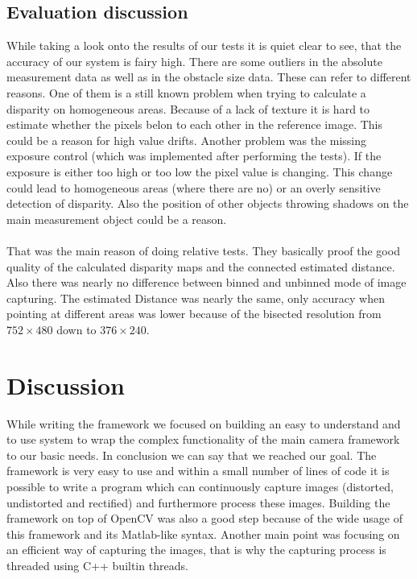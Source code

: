\documentclass[11pt]{article}
\begin{document}
\subsection{Evaluation discussion}
While taking a look onto the results of our tests it is quiet clear to see, that the accuracy of our system is fairy high. There are some outliers in the absolute measurement data as well as in the obstacle size data. These can refer to different reasons. One of them is a still known problem when trying to calculate a disparity on homogeneous areas. Because of a lack of texture it is hard to estimate whether the pixels belon to each other in the reference image. This could be a reason for high value drifts. Another problem was the missing exposure control (which was implemented after performing the tests). If the exposure is either too high or too low the pixel value is changing. This change could lead to homogeneous areas (where there are no) or an overly sensitive detection of disparity. Also the position of other objects throwing shadows on the main measurement object could be a reason. \\\\
That was the main reason of doing relative tests. They basically proof the good quality of the calculated disparity maps and the connected estimated distance. Also there was nearly no difference between binned and unbinned mode of image capturing. The estimated Distance was nearly the same, only accuracy when pointing at different areas was lower because of the bisected resolution from $752\times480$ down to $376\times240$.

\section{Discussion}
While writing the framework we focused on building an easy to understand and to use system to wrap the complex functionality of the main camera framework to our basic needs. In conclusion we can say that we reached our goal. The framework is very easy to use and within a small number of lines of code it is possible to write a program which can continuously capture images (distorted, undistorted and rectified) and furthermore process these images. Building the framework on top of OpenCV was also a good step because of the wide usage of this framework and its Matlab-like syntax. Another main point was focusing on an efficient way of capturing the images, that is why the capturing process is threaded using C++ builtin threads.
\end{document}
